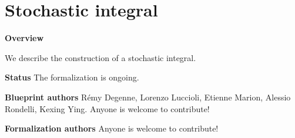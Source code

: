 \putbib

\part{Stochastic integral}

\textbf{Overview}

We describe the construction of a stochastic integral.

\textbf{Status} The formalization is ongoing.

\textbf{Blueprint authors} Rémy Degenne, Lorenzo Luccioli, Etienne Marion, Alessio Rondelli, Kexing Ying. Anyone is welcome to contribute!

\textbf{Formalization authors} Anyone is welcome to contribute!











\putbib
